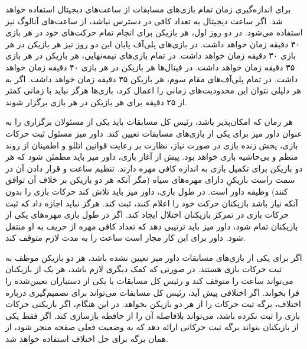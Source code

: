 


برای اندازه‌گیری زمان تمام بازی‌های مسابقات از ساعت‌های دیجیتال استفاده خواهد شد. اگر ساعت دیجیتال به تعداد کافی در دسترس نباشد، از ساعت‌های آنالوگ نیز استفاده می‌شود. در دو روز اول، هر بازیکن برای انجام تمام حرکت‌های خود در هر بازی ۳۰ دقیقه زمان خواهد داشت. در بازی‌های پلی‌آف پایان این دو روز نیز هر بازیکن در هر بازی ۳۰ دقیقه زمان خواهد داشت. در تمام بازی‌های نیمه‌نهایی، هر بازیکن در هر بازی ۳۵ دقیقه زمان خواهد داشت. در فینال‌ها هر بازیکن در هر بازی ۴۰ دقیقه زمان خواهد داشت. در تمام پلی‌آف‌های مقام سوم، هر بازیکن ۳۵ دقیقه زمان خواهد داشت. اگر به هر دلیلی نتوان این محدودیت‌های زمانی را اعمال کرد، بازی‌ها هرگز نباید با زمانی کمتر از ۲۵ دقیقه برای هر بازیکن در هر بازی برگزار شوند.


هر زمان که امکان‌پذیر باشد، رئیس کل مسابقات باید یکی از مسئولان برگزاری را به عنوان داور میز برای یکی از بازی‌های مسابقات تعیین کند. داور میز مسئول ثبت حرکات بازی، پخش زنده بازی در صورت نیاز، نظارت بر رعایت قوانین اتللو و اطمینان از روند منظم و بی‌حاشیه بازی خواهد بود. پیش از آغاز بازی، داور میز باید مطمئن شود که هر دو بازیکن برای تکمیل بازی به اندازه کافی مهره دارند. تنظیم ساعت و قرار دادن آن در سمت راست بازیکنِ دارای مهره‌های سیاه (مگر آنکه هر دو بازیکن بر خلاف آن توافق کنند) وظیفه داور است. در طول بازی، داور میز باید تلاش کند حرکات بازی را بدون آنکه نیاز باشد بازیکنان حرکت خود را اعلام کنند، ثبت کند. هرگز نباید اجازه داد که ثبت حرکات بازی در تمرکز بازیکنان اختلال ایجاد کند. اگر در طول بازی مهره‌های یکی از بازیکنان تمام شود، داور میز باید ترتیبی دهد که تعداد کافی مهره از حریف به او منتقل شود. داور برای این کار مجاز است ساعت را به مدت لازم متوقف کند.

اگر برای یکی از بازی‌های مسابقات داور میز تعیین نشده باشد، هر دو بازیکن موظف به ثبت حرکات بازی هستند. در صورتی که کمک دیگری لازم باشد، هر یک از بازیکنان می‌تواند ساعت را متوقف کند و رئیس کل مسابقات یا یکی از دستیاران تعیین‌شده را فرا بخواند. اگر اختلافی پیش آید، رئیس کل مسابقات می‌تواند برای تصمیم‌گیری درباره اختلاف، برگه ثبت حرکات را از هر دو بازیکن بخواهد. در این هنگام، اگر بازیکنی حرکات بازی را ثبت نکرده باشد، می‌تواند بلافاصله آن را از حافظه بازسازی کند. اگر فقط یکی از بازیکنان بتواند برگه ثبت حرکاتی ارائه دهد که به وضعیت فعلی صفحه منجر شود، از همان برگه برای حل اختلاف استفاده خواهد شد.



